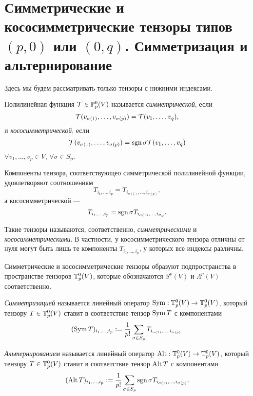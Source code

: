\section{Симметрические и кососимметрические тензоры типов $(p, 0)$ или $(0, q)$. Симметризация и альтернирование}

Здесь мы будем рассматривать только тензоры с нижними индексами.

\begin{definition}
    Полилинейная функция $\mathcal{T} \in \mathbb{P}_p^0(V)$ называется \textit{симметрической}, если
    \[
        \mathcal{T}(v_{\sigma(1)}, \ldots, v_{\sigma(p)}) = \mathcal{T}(v_1, \ldots, v_q),
    \]
    и \textit{кососимметрической}, если
    \[
        \mathcal{T}(v_{\sigma(1)}, \ldots, v_{\sigma(p)}) = \operatorname{sgn}\sigma\mathcal{T}(v_1, \ldots, v_q)
    \]
    $\forall v_1, \ldots, v_p \in V$, $\forall \sigma \in S_p$.
\end{definition}

Компоненты тензора, соответствующео симметрической полилинейной функции, удовлетворяют соотношениям
\[
    T_{i_1, \ldots, i_p} = T_{i_{\sigma(1)}, \ldots, i_{\sigma(p)}},
\]
а кососимметрической ---
\[
    T_{i_1, \ldots, i_p} = \operatorname{sgn}\sigma T_{i_{\sigma(1)}, \ldots, i_{\sigma_p}}.
\]

Такие тензоры называются, соответственно, \textit{симметрическими} и \textit{кососимметрическими}. В частности, у кососимметрического тензора отличны от нуля могут быть лишь те компоненты $T_{i_1, \ldots, i_p}$, у которых все индексы различны.

Симметрические и кососимметрические тензоры образуют подпространства в пространстве тензоров $\mathbb{T}_p^0(V)$, которые обозначаются $S^p(V)$ и $\Lambda^p(V)$ соответственно.

\begin{definition}
    \textit{Симметризацией} называется линейный оператор $\operatorname{Sym}: \mathbb{T}_p^0(V) \to \mathbb{T}_p^0(V)$, который тензору $T \in \mathbb{T}_p^0(V)$ ставит в соответствие тензор $\operatorname{Sym} T$ с компонентами
    \[
        (\operatorname{Sym} T)_{i_1, \ldots, i_p} \vcentcolon = \frac{1}{p!}\sum_{\sigma \in S_p}T_{i_{\sigma(1)}, \ldots, i_{\sigma(p)}}.
    \]
\end{definition}

\begin{definition}
    \textit{Альтернированием} называется линейный оператор $\operatorname{Alt}: \mathbb{T}_p^0(V) \to \mathbb{T}_p^0(V)$, который тензору $T \in \mathbb{T}_p^0(V)$ ставит в соответствие тензор $\operatorname{Alt} T$ с компонентами
    \[
        (\operatorname{Alt} T)_{i_1, \ldots, i_p} \vcentcolon = \frac{1}{p!}\sum_{\sigma \in S_p}\operatorname{sgn}\sigma T_{i_{\sigma(1)}, \ldots, i_{\sigma(p)}}.
    \]
\end{definition}

